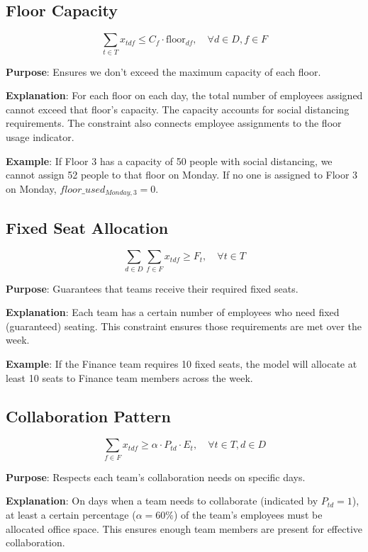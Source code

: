 \documentclass[12pt]{article}
\begin{document}
\subsection{Floor Capacity}
\begin{equation}
\sum_{t \in T} x_{tdf} \leq C_f \cdot \text{floor}_{df}, \quad \forall d \in D, f \in F
\end{equation}

\textbf{Purpose}: Ensures we don't exceed the maximum capacity of each floor.

\textbf{Explanation}: For each floor on each day, the total number of employees assigned cannot exceed that floor's capacity. The capacity accounts for social distancing requirements. The constraint also connects employee assignments to the floor usage indicator.

\textbf{Example}: If Floor 3 has a capacity of 50 people with social distancing, we cannot assign 52 people to that floor on Monday. If no one is assigned to Floor 3 on Monday, $floor\_used_{Monday,3} = 0$.

\subsection{Fixed Seat Allocation}
\begin{equation}
\sum_{d \in D} \sum_{f \in F} x_{tdf} \geq F_t, \quad \forall t \in T
\end{equation}

\textbf{Purpose}: Guarantees that teams receive their required fixed seats.

\textbf{Explanation}: Each team has a certain number of employees who need fixed (guaranteed) seating. This constraint ensures those requirements are met over the week.

\textbf{Example}: If the Finance team requires 10 fixed seats, the model will allocate at least 10 seats to Finance team members across the week.

\subsection{Collaboration Pattern}
\begin{equation}
\sum_{f \in F} x_{tdf} \geq \alpha \cdot P_{td} \cdot E_t, \quad \forall t \in T, d \in D
\end{equation}

\textbf{Purpose}: Respects each team's collaboration needs on specific days.

\textbf{Explanation}: On days when a team needs to collaborate (indicated by $P_{td} = 1$), at least a certain percentage ($\alpha = 60\%$) of the team's employees must be allocated office space. This ensures enough team members are present for effective collaboration.
\end{document}
